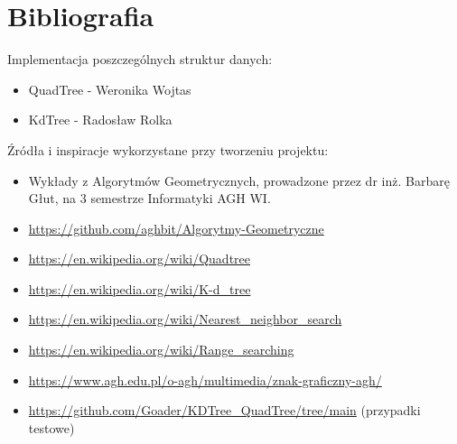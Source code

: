 \documentclass{lab}
\begin{document}
\newpage
\section{Bibliografia}
Implementacja poszczególnych struktur danych:
\begin{itemize}
  \item QuadTree - Weronika Wojtas
  \item KdTree - Radosław Rolka
\end{itemize}

Źródła i inspiracje wykorzystane przy tworzeniu projektu:
\begin{itemize}
  \item Wykłady z Algorytmów Geometrycznych, prowadzone przez dr inż. Barbarę Głut, na 3 semestrze Informatyki AGH WI.
  \item \url{https://github.com/aghbit/Algorytmy-Geometryczne}
  \item \url{https://en.wikipedia.org/wiki/Quadtree}
  \item \url{https://en.wikipedia.org/wiki/K-d_tree}
  \item \url{https://en.wikipedia.org/wiki/Nearest_neighbor_search}
  \item \url{https://en.wikipedia.org/wiki/Range_searching}
  \item \url{https://www.agh.edu.pl/o-agh/multimedia/znak-graficzny-agh/}
  \item \url{https://github.com/Goader/KDTree_QuadTree/tree/main} (przypadki testowe)
\end{itemize}
\end{document}
